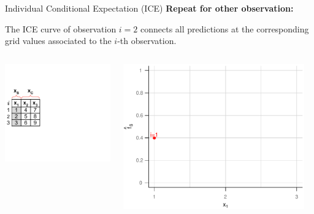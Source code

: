 \documentclass[11pt,compress,t,notes=noshow, xcolor=table]{beamer}
\begin{document}
\begin{vbframe}{Individual Conditional Expectation (ICE)}
\textbf{Repeat for other observation:}

The ICE curve of observation $i=2$ connects all predictions at the corresponding grid values associated to the $i$-th observation.

\framebreak

\begin{columns}[T]
\begin{column}{0.45\textwidth}
\includegraphics[page=7, trim=0cm 0.35cm 0.85cm 0.35cm, width=\textwidth]{figure_man/ice_plot_demo}
\end{column}
\begin{column}{0.55\textwidth}
\includegraphics[page=5, width=0.95\textwidth]{figure_man/ICE}
\end{column}
\end{columns}
\vspace*{\topsep}


\end{vbframe}
\end{document}
